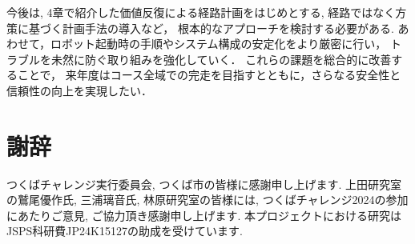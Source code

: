 \documentclass[twocolumn,9pt]{jsproceedings}
\begin{document}
今後は, 4章で紹介した価値反復による経路計画をはじめとする, 
経路ではなく方策に基づく計画手法の導入など，
根本的なアプローチを検討する必要がある. 
あわせて，ロボット起動時の手順やシステム構成の安定化をより厳密に行い，
トラブルを未然に防ぐ取り組みを強化していく．
これらの課題を総合的に改善することで，
来年度はコース全域での完走を目指すとともに，さらなる安全性と信頼性の向上を実現したい．


\section*{謝辞}
つくばチャレンジ実行委員会, つくば市の皆様に感謝申し上げます. 
上田研究室の鷲尾優作氏, 三浦璃音氏, 
林原研究室の皆様には, つくばチャレンジ2024の参加にあたりご意見, ご協力頂き感謝申し上げます. 
本プロジェクトにおける研究はJSPS科研費JP24K15127の助成を受けています. 
\end{document}
